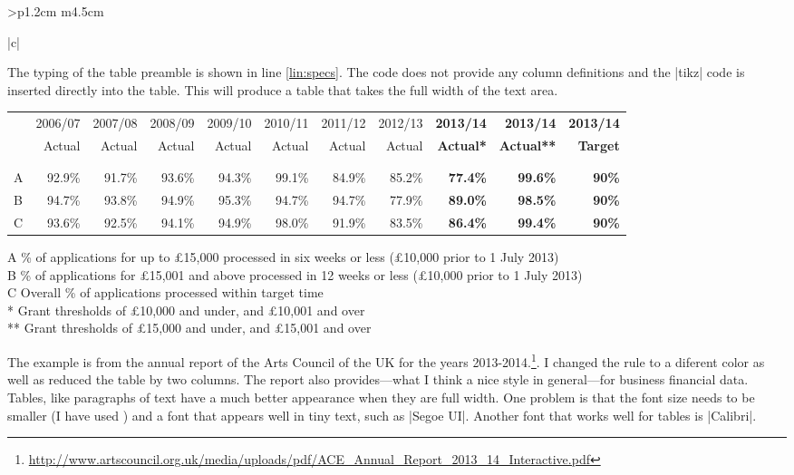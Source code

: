 \begin{tabular}{>{\bfseries}p{1.2cm} m{4.5cm}}
\begin{tabular}[t]{|c|}
\begin{longtable}
\begin{scriptexample}{}{}
The typing of the table preamble is shown in line \ref{lin:specs}. The code does not provide any column definitions and the |tikz| code is inserted directly into the table. This will produce a table that takes the full width of the
text area. 
\bigskip
\parindent 0pt



{\UI\footnotesize
\begin{tabular}[\textwidth]{@{}l r r r r r r r>{\bfseries\color{black!80}}r >{\bfseries\color{black!80}}r >{\bfseries\color{black!80}}r@{}} 
& 2006/07 &2007/08 &2008/09 &2009/10 &2010/11 &2011/12 &2012/13 &2013/14 &2013/14 &2013/14\\
& Actual &Actual &Actual &Actual &Actual &Actual &Actual &Actual* &Actual** &Target\\
\begin{tikzpicture}[remember picture, overlay]
\path [midrule] (0,0) -- (\the\linewidth,0) node {};
\end{tikzpicture}\\ \\[-1pt]
A   &92.9\% &91.7\% &93.6\% &94.3\% &99.1\% &84.9\% &85.2\% &77.4\% &99.6\% &90\%\\

B  &94.7\% &93.8\% &94.9\% &95.3\% &94.7\% &94.7\% &77.9\% &89.0\% &98.5\% &90\%\\

C  &93.6\% &92.5\% &94.1\% &94.9\% &98.0\% &91.9\% &83.5\% &86.4\% &99.4\% &90\%\\
\end{tabular}
\medskip

A \% of applications for up to £15,000 processed in six weeks or less (£10,000 prior to 1 July 2013)\\
B \% of applications for £15,001 and above processed in 12 weeks or less (£10,000 prior to 1 July 2013)\\
C Overall \% of applications processed within target time\\
* Grant thresholds of £10,000 and under, and £10,001 and over\\
** Grant thresholds of £15,000 and under, and £15,001 and over\\

} %

The example is from the annual report of the Arts Council of the UK for the years 2013-2014.\footnote{\protect\url{http://www.artscouncil.org.uk/media/uploads/pdf/ACE_Annual_Report_2013_14_Interactive.pdf}}. I changed the rule to a diferent color as well as reduced the table by two columns.  The report also provides---what I think a nice style in general---for business financial data. Tables, like paragraphs of text have a much better appearance
when they are full width. One problem is that the font size needs to be smaller (I have used \cmd{\footnotesize}) and a font that appears well in tiny text, such as |Segoe UI|. Another font that works well for tables is |Calibri|.



\end{scriptexample}
\end{longtable}
\end{tabular}
\end{tabular}
